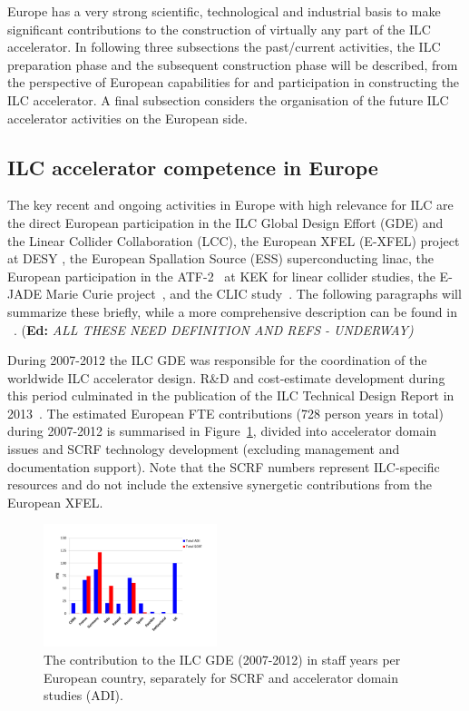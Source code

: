 \documentclass[%
 reprint,
 amsmath,amssymb,
 aps,
]{revtex4-1}
\newif\ifEdNotes \EdNotestrue
\newcommand{\doednote}[1]{{\color{red}(\textbf{Ed:} \textit{#1)}}}
\newcommand{\ednote}[1]{\ifEdNotes 
  \doednote{#1} 
\fi}
\begin{document}
Europe has a very strong scientific, technological and industrial basis to make significant contributions to the construction of virtually 
any part of the ILC accelerator. In following three subsections the past/current activities, the ILC preparation phase and the subsequent construction phase 
will be described, from the perspective of European capabilities for and participation in constructing the ILC accelerator. 
A final subsection considers the organisation of the future ILC accelerator activities on the European side. 

\subsection{ILC accelerator competence in Europe~\label{sec:acc:competence}}

The key recent and ongoing activities in Europe with high relevance for ILC are the direct
European participation in the ILC Global Design Effort (GDE) and the Linear Collider Collaboration (LCC),
the European XFEL (E-XFEL) project at DESY , the European Spallation Source (ESS) superconducting linac, the European 
participation in the ATF-2~\cite{Grishanov:2005ek,Grishanov:2006kx} at KEK for linear collider studies, the E-JADE Marie 
Curie project~\cite{ejade}, and the CLIC study~\cite{Aicheler:2012bya,Linssen:2012hp}. The following paragraphs 
will summarize these briefly, while a more comprehensive description can be found in ~\cite{ejade-report}. \ednote{ALL THESE NEED DEFINITION AND REFS - UNDERWAY}

During 2007-2012 the ILC GDE was responsible for the coordination of the worldwide ILC accelerator design. 
R\&D and cost-estimate development during this period culminated in the publication of the ILC Technical Design Report in 2013~\cite{Behnke:2013xla}. 
The estimated European FTE contributions (728 person years in total) during 2007-2012 is summarised in Figure~\ref{fig:PrePrep:ilcgde4}, 
divided into accelerator domain issues and SCRF technology development (excluding management and documentation support). 
Note that the SCRF numbers represent ILC-specific resources and do not include the extensive synergetic contributions from the European XFEL.

\begin{figure}[htbp]
\includegraphics[width=0.45\textwidth]{figures/EU-GDE-FTE-columns-per-country.pdf}
\caption{\label{fig:PrePrep:ilcgde4} The contribution to the ILC GDE (2007-2012) in staff years per European country, separately for SCRF and accelerator domain studies (ADI).}
\end{figure}
\end{document}
